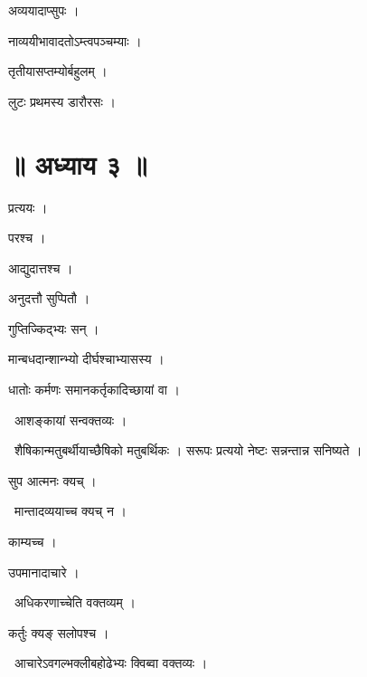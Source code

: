 \documentclass[10pt, openany, oneside]{book}
\begin{document}
\noindent अव्ययादाप्सुपः ।

\noindent नाव्ययीभावादतोऽम्त्वपञ्चम्याः ।

\noindent तृतीयासप्तम्योर्बहुलम् ।

\noindent लुटः प्रथमस्य डारौरसः ।

\section*{॥ अध्याय ३ ॥}

\noindent प्रत्ययः ।

\noindent परश्च ।

\noindent आद्युदात्तश्च ।

\noindent अनुदत्तौ सुप्पितौ ।

\noindent गुप्तिज्किद्भ्यः सन् ।

\noindent मान्बधदान्शान्भ्यो दीर्घश्चाभ्यासस्य ।

\noindent धातोः कर्मणः समानकर्तृकादिच्छायां वा ।

\par\noindent\hspace{1.5em}{\vps वा॰}~{\qt आशङ्कायां सन्वक्तव्यः ।}

\par\noindent\hspace{1.5em}{\vps वा॰}~{\qt शैषिकान्मतुबर्थीयाच्छैषिको मतुबर्थिकः । सरूपः प्रत्ययो नेष्टः सन्नन्तान्न सनिष्यते ।}

\noindent सुप आत्मनः क्यच् ।

\par\noindent\hspace{1.5em}{\vps वा॰}~{\qt मान्तादव्ययाच्च क्यच् न ।}

\noindent काम्यच्च ।

\noindent उपमानादाचारे ।

\par\noindent\hspace{1.5em}{\vps वा॰}~{\qt अधिकरणाच्चेति वक्तव्यम् ।}

\noindent कर्तुः क्यङ् सलोपश्च ।

\par\noindent\hspace{1.5em}{\vps वा॰}~{\qt आचारेऽवगल्भक्लीबहोढेभ्यः क्विब्वा वक्तव्यः ।}
\end{document}
